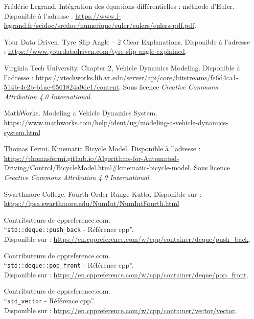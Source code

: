 \documentclass[a4paper,12pt]{report}
\begin{document}
    \begin{thebibliography}{9}
        Frédéric Legrand.
        Intégration des équations différentielles : méthode d'Euler.
        Disponible à l'adresse : \url{https://www.f-legrand.fr/scidoc/srcdoc/numerique/euler/eulers/eulers-pdf.pdf}.

        Your Data Driven.
        Tyre Slip Angle – 2 Clear Explanations.
        Disponible à l'adresse : \url{https://www.yourdatadriven.com/tyre-slip-angle-explained}.

        Virginia Tech University.
        Chapter 2, Vehicle Dynamics Modeling.
        Disponible à l'adresse : \url{https://vtechworks.lib.vt.edu/server/api/core/bitstreams/fe6d4ca1-514b-4e2b-b1ac-6561824a9de1/content}.
        Sous licence \textit{Creative Commons Attribution 4.0 International}.

        MathWorks.
        Modeling a Vehicle Dynamics System.
        \url{https://www.mathworks.com/help/ident/ug/modeling-a-vehicle-dynamics-system.html}

        Thomas Fermi.
        Kinematic Bicycle Model.
        Disponible à l'adresse : \url{https://thomasfermi.github.io/Algorithms-for-Automated-Driving/Control/BicycleModel.html#kinematic-bicycle-model}.
        Sous licence \textit{Creative Commons Attribution 4.0 International}.

        Swarthmore College.
        Fourth Order Runge-Kutta.
        Disponible sur : \url{https://lpsa.swarthmore.edu/NumInt/NumIntFourth.html}

        Contributeurs de cppreference.com. \\
        ``\texttt{std::\gls{deque}::push\_back} - Référence \gls{cpp}''. \\
        Disponible sur : \url{https://en.cppreference.com/w/cpp/container/deque/push_back}.

        Contributeurs de cppreference.com.\\
        ``\texttt{std::\gls{deque}::pop\_front} - Référence \gls{cpp}''.\\
        Disponible sur : \url{https://en.cppreference.com/w/cpp/container/deque/pop_front}.

        Contributeurs de cppreference.com.\\
        ``\texttt{\gls{std_vector}} - Référence \gls{cpp}''.\\
        Disponible sur : \url{https://en.cppreference.com/w/cpp/container/vector/vector}.


\end{thebibliography}
\end{document}
